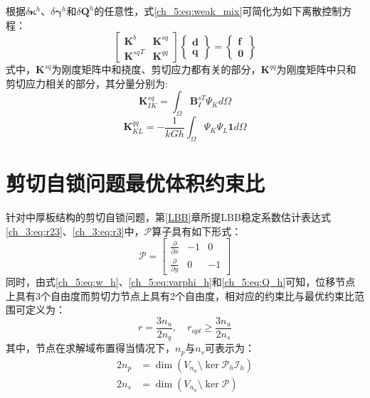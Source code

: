 根据$\delta\boldsymbol\kappa^h$、$\delta\boldsymbol\gamma^h$和$\delta\boldsymbol Q^h$的任意性，式\eqref{ch_5:eq:weak_mix}可简化为如下离散控制方程：
\begin{equation} \label{equilibrium_mindlin_mix}
    \begin{bmatrix}\boldsymbol{K}^{b}&\boldsymbol{K}^{sq}\\{\boldsymbol{K}^{sq}}^T&\boldsymbol{K}^{qq}\end{bmatrix}
    \begin{Bmatrix}\boldsymbol{d}\\\boldsymbol{q}\end{Bmatrix}=
    \begin{Bmatrix}\boldsymbol{f}\\\boldsymbol{0}\end{Bmatrix}
\end{equation}
式中，$\boldsymbol K^{sq}$为刚度矩阵中和挠度、剪切应力都有关的部分，$\boldsymbol K^{qq}$为刚度矩阵中只和剪切应力相关的部分，其分量分别为:
\begin{equation} 
    \boldsymbol K^{sq}_{IK} = \int_\Omega \boldsymbol B^{sT}_I \Psi_K d\Omega
\end{equation} 
\begin{equation} 
    \boldsymbol K^{qq}_{KL} = -\frac{1}{kGh} \int_\Omega \Psi_K \Psi_L \boldsymbol 1 d\Omega
\end{equation}

\section{剪切自锁问题最优体积约束比}

针对中厚板结构的剪切自锁问题，第\ref{LBB}章所提LBB稳定系数估计表达式\eqref{ch_3:eq:r23}、\eqref{ch_3:eq:r3}中，$\mathcal P$算子具有如下形式：
\begin{equation}\label{ch_5:eq:P}
    \mathcal P = \begin{bmatrix}
        \frac{\partial }{\partial x} & -1 & 0 \\
        \frac{\partial }{\partial y} & 0 & -1
    \end{bmatrix}
\end{equation}
同时，由式\eqref{ch_5:eq:w_h}、\eqref{ch_5:eq:varphi_h}和\eqref{ch_5:eq:Q_h}可知，位移节点上具有3个自由度而剪切力节点上具有2个自由度，相对应的约束比与最优约束比范围可定义为：
\begin{equation}
    r = \frac{3n_u}{2n_q}, \quad r_{opt} \ge \frac{3n_u}{2n_s} 
\end{equation}
其中，节点在求解域布置得当情况下，$n_p$与$n_s$可表示为：
\begin{align}
    2n_p &= \dim(V_{n_u} \setminus \ker \mathcal P_h \mathcal I_h) \\
    2n_s &= \dim(V_{n_u} \setminus \ker \mathcal P)
\end{align}

